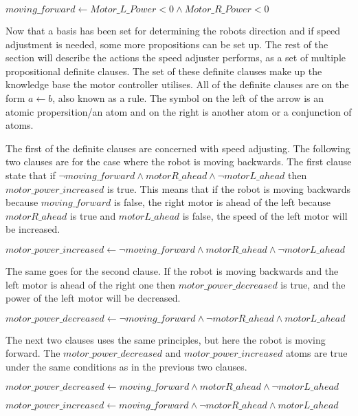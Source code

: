 \hspace{3mm} $moving\_forward \leftarrow Motor\_L\_Power < 0 \land Motor\_R\_Power < 0$

Now that a basis has been set for determining the robots direction and if speed adjustment is needed, some more propositions can be set up. The rest of the section will describe the actions the speed adjuster performs, as a set of multiple propositional definite clauses. The set of these definite clauses make up the knowledge base the motor controller utilises. All of the definite clauses are on the form $a \leftarrow b$, also known as a rule. The symbol on the left of the arrow is an atomic propersition/an atom and on the right is another atom or a conjunction of atoms.

The first of the definite clauses are concerned with speed adjusting. The following two clauses are for the case where the robot is moving backwards. The first clause state that if $\lnot moving\_forward \land motorR\_ahead \land \lnot motorL\_ahead$ then $motor\_power\_increased$ is true. This means that if the robot is moving backwards because $moving\_forward$ is false, the right motor is ahead of the left because $motorR\_ahead$ is true and $motorL\_ahead$ is false, the speed of the left motor will be increased.

\hspace{3mm} $motor\_power\_increased \leftarrow \lnot moving\_forward \land motorR\_ahead \land \lnot motorL\_ahead$ 

The same goes for the second clause. If the robot is moving backwards and the left motor is ahead of the right one then $motor\_power\_decreased$ is true, and the power of the left motor will be decreased.

\hspace{3mm} $motor\_power\_decreased \leftarrow \lnot moving\_forward \land \lnot motorR\_ahead \land motorL\_ahead$

The next two clauses uses the same principles, but here the robot is moving forward. The $motor\_power\_decreased$ and $motor\_power\_increased$ atoms are true under the same conditions as in the previous two clauses.

\hspace{3mm} $motor\_power\_decreased \leftarrow moving\_forward \land motorR\_ahead \land \lnot motorL\_ahead$

\hspace{3mm} $motor\_power\_increased \leftarrow moving\_forward \land \lnot motorR\_ahead \land motorL\_ahead$

